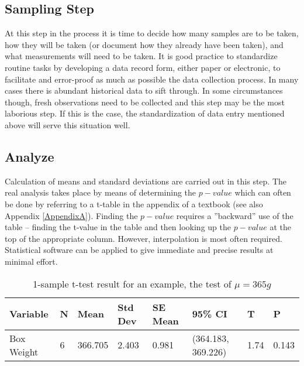 \subsection{Sampling Step}
At this step in the process it is time to decide how many samples are to be taken, how they will be taken (or document how they already have been taken), and what measurements will need to be taken.  It is good practice to standardize routine tasks by developing a data record form, either paper or electronic, to facilitate and error-proof as much as possible the data collection process.  In many cases there is abundant historical data to sift through.  In some circumstances though, fresh observations need to be collected and this step may be the most laborious step.  If this is the case, the standardization of data entry mentioned above will serve this situation well.

\subsection{Analyze}
Calculation of means and standard deviations are carried out in this step.  The real analysis takes place by means of determining the $p-value$ which can often be done by referring to a t-table in the appendix of a textbook (see also Appendix \ref{AppendixA}). Finding the $p-value$ requires a ''backward'' use of the table -- finding the t-value in the table and then looking up the $p-value$ at the top of the appropriate column.  However, interpolation is most often required. Statistical software can be applied to give immediate and precise results at minimal effort.

\begin{table}
	\begin{center}
		{\scriptsize 
			\begin{tabular}{llllllll}
			\toprule
			\textbf{Variable} & \textbf{N} & \textbf{Mean} & \textbf{Std Dev} & \textbf{SE Mean} & \textbf{95\% CI} & \textbf{T} & \textbf{P} \\
			\midrule
			Box Weight & 6 & 366.705 & 2.403 & 0.981 & (364.183, 369.226) & 1.74 & 0.143 \\ 
			\end{tabular} 
		}
\end{center}
	\caption{1-sample t-test result for an example, the test of $ \mu = 365 g $ }\label{1samplet} 
\end{table}


